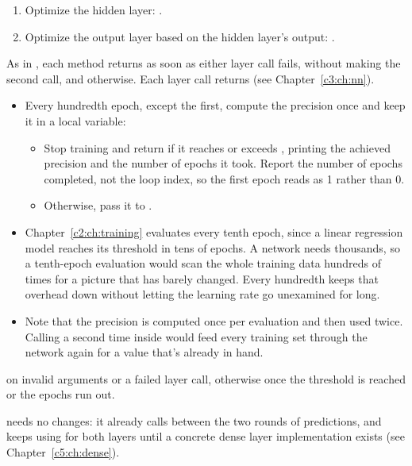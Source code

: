 \begin{enumerate}
  \item Optimize the hidden layer: .
  \item Optimize the output layer based on the hidden layer's output:\newline
    .
\end{enumerate}
As in , each method returns  as soon as either layer call fails,
without making the second call, and  otherwise. Each layer call returns  (see
Chapter~\ref{c3:ch:nn}).

\begin{itemize}
  \item Every hundredth epoch, except the first, compute the precision once and keep it in a local
    variable:
  \begin{itemize}
    \item Stop training and return  if it reaches or exceeds ,
      printing the achieved precision and the number of epochs it took. Report the number of epochs
      completed, not the loop index, so the first epoch reads as 1 rather than 0.
    \item Otherwise, pass it to .
  \end{itemize}
  \item Chapter~\ref{c2:ch:training} evaluates every tenth epoch, since a linear regression model
    reaches its threshold in tens of epochs. A network needs thousands, so a tenth-epoch evaluation
    would scan the whole training data hundreds of times for a picture that has barely changed.
    Every hundredth keeps that overhead down without letting the learning rate go unexamined for
    long.
  \item Note that the precision is computed once per evaluation and then used twice. Calling
     a second time inside  would feed every training
    set through the network again for a value that's already in hand.
\end{itemize}

 on invalid arguments or a failed layer call, otherwise  once the threshold
is reached or the epochs run out.

\label{c4:ex:13}
 needs no changes: it already calls  between the two rounds of
predictions, and keeps using  for both layers until a concrete dense
layer implementation exists (see Chapter~\ref{c5:ch:dense}).

